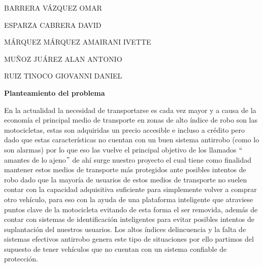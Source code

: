 \documentclass[12pt]{article}
\begin{document}
\begin{Center}
{\fontsize{10pt}{12.0pt}\selectfont BARRERA VÁZQUEZ OMAR\par}
\end{Center}\par

\begin{Center}
{\fontsize{10pt}{12.0pt}\selectfont ESPARZA CABRERA DAVID\par}
\end{Center}\par

\begin{Center}
{\fontsize{10pt}{12.0pt}\selectfont MÁRQUEZ MÁRQUEZ AMAIRANI IVETTE\par}
\end{Center}\par

\begin{Center}
{\fontsize{10pt}{12.0pt}\selectfont MUÑOZ JUÁREZ ALAN ANTONIO\par}
\end{Center}\par

\begin{Center}
{\fontsize{10pt}{12.0pt}\selectfont RUIZ TINOCO GIOVANNI DANIEL\par}
\end{Center}\par
\newpage

\vspace{\baselineskip}
\textbf{Planteamiento del problema }\par

En la actualidad la necesidad de transportarse es cada vez mayor y a causa de la economía el principal medio de transporte en zonas de alto índice de robo son las motocicletas, estas son adquiridas un precio accesible e incluso a crédito pero dado que estas características no cuentan con un buen sistema antirrobo (como lo son alarmas) por lo que eso las vuelve el principal objetivo de los llamados $``$amantes de lo ajeno$"$  de ahí surge nuestro proyecto el cual tiene como finalidad mantener estos medios de transporte más protegidos ante posibles intentos de robo dado que la mayoría de usuarios de estos medios de transporte no suelen contar con la capacidad adquisitiva suficiente para simplemente volver a comprar otro vehículo, para eso con la ayuda de una plataforma inteligente que atraviese puntos clave de la motocicleta evitando de esta forma el ser removida, además de contar con sistemas de identificación inteligentes para evitar posibles intentos de suplantación del nuestros usuarios. Los altos índices delincuencia y la falta de sistemas efectivos antirrobo genera este tipo de situaciones por ello partimos del supuesto de tener vehículos que no cuentan con un sistema confiable de protección.\par
\end{document}

